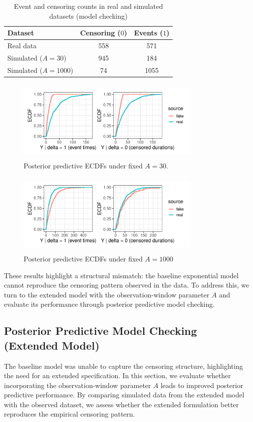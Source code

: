 \begin{table}[H]
\centering
\caption{{\small Event and censoring counts in real and simulated datasets (model checking)}}
\label{tab:modelcheck_counts}
\small  
\begin{tabular}{lcc}
\toprule
\textbf{Dataset} & \textbf{Censoring ($0$)} & \textbf{Events ($1$)} \\
\midrule
Real data        & 558  & 571  \\
Simulated ($A=30$)   & 945  & 184  \\
Simulated ($A=1000$) & 74   & 1055 \\
\bottomrule
\end{tabular}
\end{table}

\begin{figure}[H]
    \centering
    \includegraphics[height=4cm, width=0.8\textwidth]{images/ppc_two_a30.pdf}
    \caption{{\small Posterior predictive ECDFs under fixed $A=30$.}}
    \label{fig:ppc_a30}
\end{figure}

\begin{figure}[H]
    \centering
    \includegraphics[height=4cm, width=0.8\textwidth]{images/ppc_two_a1000.pdf}
    \caption{{\small Posterior predictive ECDFs under fixed $A=1000$}}
    \label{fig:ppc_a1000}
\end{figure}
These results highlight a structural mismatch: the baseline exponential model cannot reproduce the censoring pattern observed in the data. To address this, we turn to the extended model with the observation-window parameter $A$ and evaluate its performance through posterior predictive model checking.


\subsection{Posterior Predictive Model Checking (Extended Model)}

The baseline model was unable to capture the censoring structure, highlighting the need for an extended specification. In this section, we evaluate whether incorporating the observation-window parameter $A$ leads to improved posterior predictive performance. By comparing simulated data from the extended model with the observed dataset, we assess whether the extended formulation better reproduces the empirical censoring pattern.